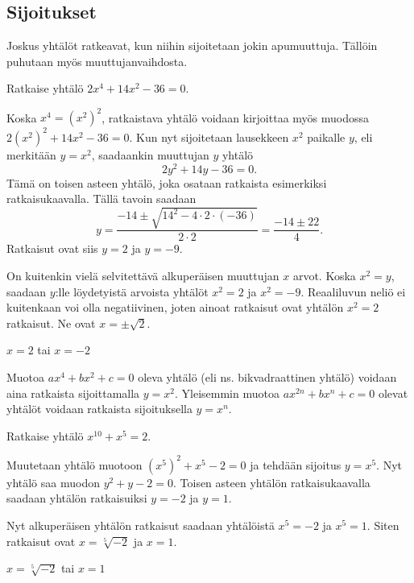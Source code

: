 \subsection*{Sijoitukset}

Joskus yhtälöt ratkeavat, kun niihin sijoitetaan jokin apumuuttuja.
Tällöin puhutaan myös muuttujanvaihdosta.


\begin{esimerkki}
Ratkaise yhtälö $2x^4+14x^2-36=0$.

\begin{esimratk}
Koska $x^4=(x^2)^2$, ratkaistava yhtälö voidaan kirjoittaa myös muodossa $2(x^2)^2+14x^2-36=0$.
Kun nyt sijoitetaan lausekkeen $x^2$ paikalle $y$, eli merkitään $y=x^2$, saadaankin muuttujan $y$ yhtälö
\[
2y^2+14y-36=0.
\]
Tämä on toisen asteen yhtälö, joka osataan ratkaista esimerkiksi ratkaisukaavalla.
Tällä tavoin saadaan
\[
y=\frac{-14\pm\sqrt{14^2-4\cdot 2\cdot(-36)}}{2\cdot 2}=\frac{-14\pm 22}{4}.
\]
Ratkaisut ovat siis $y=2$ ja $y=-9$.

On kuitenkin vielä selvitettävä alkuperäisen muuttujan $x$ arvot.
Koska $x^2=y$, saadaan $y$:lle löydetyistä arvoista yhtälöt $x^2=2$ ja $x^2=-9$.
Reaaliluvun neliö ei kuitenkaan voi olla negatiivinen, joten ainoat ratkaisut ovat yhtälön $x^2 = 2$ ratkaisut.
Ne ovat $x=\pm\sqrt{2}$.
\end{esimratk}

\begin{esimvast}
$x=2$ tai $x=-2$
\end{esimvast}
\end{esimerkki}

Muotoa $ax^4+bx^2+c=0$ oleva yhtälö (eli ns. bikvadraattinen yhtälö) voidaan aina ratkaista sijoittamalla $y=x^2$.
Yleisemmin muotoa $ax^{2n}+bx^n+c=0$ olevat yhtälöt voidaan ratkaista sijoituksella $y = x^n$.

\begin{esimerkki}
Ratkaise yhtälö $x^{10}+x^5=2$.

\begin{esimratk}
Muutetaan yhtälö muotoon $(x^5)^2+x^5-2=0$ ja tehdään sijoitus $y = x^5$.
Nyt yhtälö saa muodon $y^2+y-2 = 0$.
Toisen asteen yhtälön ratkaisukaavalla saadaan yhtälön ratkaisuiksi $y = -2$ ja $y = 1$.

Nyt alkuperäisen yhtälön ratkaisut saadaan yhtälöistä $x^5=-2$ ja $x^5=1$. Siten ratkaisut ovat $x = \sqrt[5]{-2}$ ja $x = 1$.
\end{esimratk}

\begin{esimvast}
$x = \sqrt[5]{-2}$ tai $x = 1$
\end{esimvast}

\end{esimerkki}

